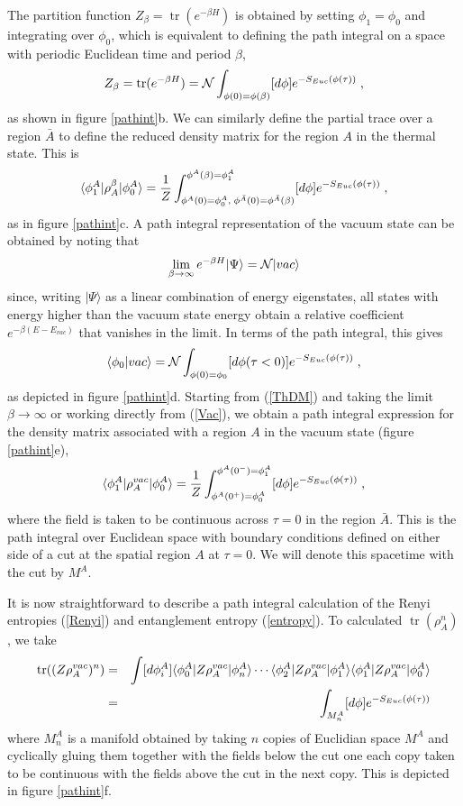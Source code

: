 \documentclass[12pt,epsf]{article}
\newcommand{\be}{\begin{equation}}
\newcommand{\ee}{\end{equation}}
\newcommand{\bea}{\begin{eqnarray}}
\newcommand{\eea}{\end{eqnarray}}
\newcommand{\tr}{\operatorname{tr}}
\begin{document}
The partition function $Z_\beta = \tr(e^{-\beta H})$ is obtained by setting $\phi_1 = \phi_0$ and integrating over $\phi_0$, which is equivalent to defining the path integral on a space with periodic Euclidean time and period $\beta$,
\be
Z_\beta = \tr(e^{-\beta H})= {\cal N} \int_{\phi(0) = \phi(\beta)} [d \phi] e^{- S_{Euc}(\phi(\tau))} \; ,
\ee
as shown in figure \ref{pathint}b.
We can similarly define the partial trace over a region $\bar{A}$ to define the reduced density matrix for the region $A$ in the thermal state. This is
\be
\label{ThDM}
\langle \phi^A_1 | \rho_A^\beta | \phi^A_0 \rangle = {1 \over Z} \int^{ \phi^A(\beta) = \phi^A_1}_{\phi^A(0) = \phi^A_0 , \;  \phi^{\bar{A}}(0) = \phi^{\bar{A}}(\beta)} [d \phi] e^{- S_{Euc}(\phi(\tau))} \; ,
\ee
as in figure \ref{pathint}c.
A path integral representation of the vacuum state can be obtained by noting that
\be
\lim_{\beta \to \infty} e^{- \beta H} | \Psi \rangle = {\cal N} | vac \rangle
\ee
since, writing $| \Psi \rangle$ as a linear combination of energy eigenstates, all states with energy higher than the vacuum state energy obtain a relative coefficient $e^{-\beta (E - E_{vac})}$ that vanishes in the limit. In terms of the path integral, this gives
\be
\label{Vac}
 \langle \phi_0 | vac \rangle = {\cal N} \int_{\phi(0) = \phi_0} [d \phi(\tau < 0)] e^{- S_{Euc}(\phi(\tau))} \; ,
\ee
as depicted in figure \ref{pathint}d.
Starting from (\ref{ThDM}) and taking the limit $\beta \to \infty$ or working directly from (\ref{Vac}), we obtain a path integral expression for the density matrix associated with a region $A$ in the vacuum state (figure \ref{pathint}e),
\be
\label{vacDM}
\langle \phi^A_1 | \rho_A^{vac} | \phi^A_0 \rangle = {1 \over Z} \int_{ \phi^A(0^+) = \phi^A_0}^{\phi^A(0^-) = \phi^A_1} [d \phi] e^{- S_{Euc}(\phi(\tau))} \; ,
\ee
where the field is taken to be continuous across $\tau=0$ in the region $\bar{A}$. This is the path integral over Euclidean space with boundary conditions defined on either side of a cut at the spatial region $A$ at $\tau=0$. We will denote this spacetime with the cut by $M^A$.

It is now straightforward to describe a path integral calculation of the Renyi entropies (\ref{Renyi}) and entanglement entropy (\ref{entropy}). To calculated $\tr(\rho_A^n)$, we take
\bea
\label{rhoN}
\tr((Z \rho^{vac}_A)^n) &=& \int [d \phi^A_i] \langle \phi^A_0 | Z \rho_A^{vac} | \phi^A_n \rangle \cdots \langle \phi^A_2 | Z \rho_A^{vac} | \phi^A_1 \rangle \langle \phi^A_1 |Z \rho_A^{vac} | \phi^A_0 \rangle \cr
&=& \int_{M^A_n} [d \phi] e^{- S_{Euc}(\phi(\tau))}
\eea
where $M^A_n$ is a manifold obtained by taking $n$ copies of Euclidian space $M^A$ and cyclically gluing them together with the fields below the cut one each copy taken to be continuous with the fields above the cut in the next copy. This is depicted in figure \ref{pathint}f.
\end{document}
